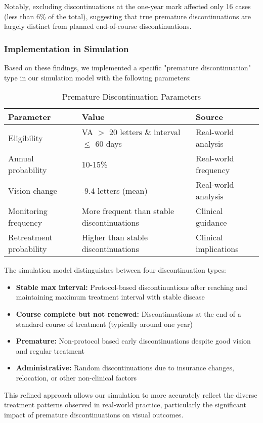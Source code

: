 Notably, excluding discontinuations at the one-year mark affected only 16 cases (less than 6\% of the total), suggesting that true premature discontinuations are largely distinct from planned end-of-course discontinuations.

\subsubsection{Implementation in Simulation}

Based on these findings, we implemented a specific "premature discontinuation" type in our simulation model with the following parameters:

\begin{table}[h]
\centering
\caption{Premature Discontinuation Parameters}
\label{tab:premature_disc_parameters}
\begin{tabular}{p{4.5cm}p{5cm}p{3cm}}
\hline
\textbf{Parameter} & \textbf{Value} & \textbf{Source} \\
\hline
Eligibility & VA $>$ 20 letters \& interval $\leq$ 60 days & Real-world analysis \\
Annual probability & 10-15\% & Real-world frequency \\
Vision change & -9.4 letters (mean) & Real-world analysis \\
Monitoring frequency & More frequent than stable discontinuations & Clinical guidance \\
Retreatment probability & Higher than stable discontinuations & Clinical implications \\
\hline
\end{tabular}
\end{table}

The simulation model distinguishes between four discontinuation types:
\begin{itemize}
    \item \textbf{Stable max interval:} Protocol-based discontinuations after reaching and maintaining maximum treatment interval with stable disease
    \item \textbf{Course complete but not renewed:} Discontinuations at the end of a standard course of treatment (typically around one year)
    \item \textbf{Premature:} Non-protocol based early discontinuations despite good vision and regular treatment
    \item \textbf{Administrative:} Random discontinuations due to insurance changes, relocation, or other non-clinical factors
\end{itemize}

This refined approach allows our simulation to more accurately reflect the diverse treatment patterns observed in real-world practice, particularly the significant impact of premature discontinuations on visual outcomes.